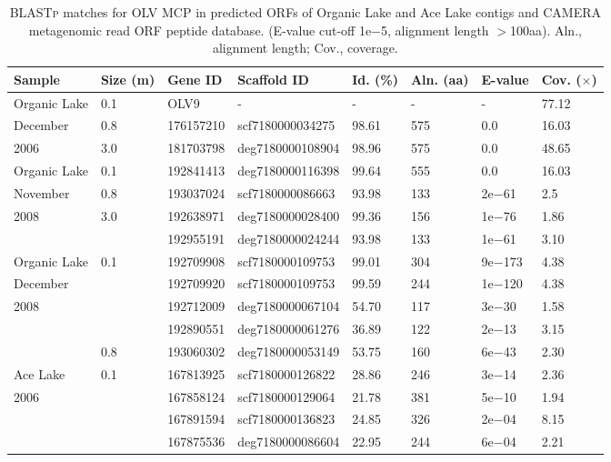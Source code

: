 \begingroup
\begin{table}
\footnotesize
\caption[\textsc{BLASTp} matches for \ac{OLV} \ac{MCP} in predicted \acp{ORF} of Organic Lake and Ace Lake contigs and \ac{CAMERA} metagenomic read \ac{ORF} peptide database]{ \textsc{BLASTp} matches for \ac{OLV} \ac{MCP} in predicted \acp{ORF} of Organic Lake and Ace Lake contigs and \ac{CAMERA} metagenomic read \ac{ORF} peptide database. (E-value cut-off 1e$-$5, alignment length $>$100aa). Aln., alignment length; Cov., coverage.}
\label{tab:olv_mcp_blastp}
\smallskip
\begin{tabularx}{\textwidth}{p{2.5cm}p{0.5cm}p{3.5cm}Xp{0.5cm}p{0.5cm}p{0.8cm}p{0.5cm}}
\toprule
\textbf{Sample} & \textbf{Size (\textmu{}m)} & \textbf{Gene ID} & \textbf{Scaffold ID} & \textbf{Id. (\%)} & \textbf{Aln. (aa)} & \textbf{E-value} & \textbf{Cov. ($\times$)} \\
\midrule
Organic Lake & 0.1 & OLV9 & - & - & - & - & 77.12 \\
December & 0.8 & 176157210 & scf7180000034275 & 98.61 & 575 & 0.0 & 16.03 \\
2006 & 3.0 & 181703798 & deg7180000108904 & 98.96 & 575 & 0.0 & 48.65 \\

Organic Lake & 0.1 & 192841413 & deg7180000116398 & 99.64 & 555 & 0.0 & 16.03 \\
November & 0.8 & 193037024 & scf7180000086663 & 93.98 & 133 & 2e$-$61 & 2.5 \\
2008 & 3.0 & 192638971 & deg7180000028400 & 99.36 & 156 & 1e$-$76 & 1.86 \\
 &  & 192955191 & deg7180000024244 & 93.98 & 133 & 1e$-$61 & 3.10 \\

Organic Lake & 0.1 & 192709908 & scf7180000109753 & 99.01 & 304 & 9e$-$173 & 4.38 \\
December &  & 192709920 & scf7180000109753 & 99.59 & 244 & 1e$-$120 & 4.38 \\
2008 &  & 192712009 & deg7180000067104 & 54.70 & 117 & 3e$-$30 & 1.58 \\
 &  & 192890551 & deg7180000061276 & 36.89 & 122 & 2e$-$13 & 3.15 \\
 & 0.8 & 193060302 & deg7180000053149 & 53.75 & 160 & 6e$-$43 & 2.30 \\

Ace Lake & 0.1 & 167813925 & scf7180000126822 & 28.86 & 246 & 3e$-$14 & 2.36  \\
2006 &  & 167858124 & scf7180000129064 & 21.78 & 381 & 5e$-$10 & 1.94 \\
 &  & 167891594 & scf7180000136823 & 24.85 & 326 & 2e$-$04 & 8.15 \\
 &  & 167875536 & deg7180000086604 & 22.95 & 244 & 6e$-$04 & 2.21 \\


\end{tabularx}
\end{table}

